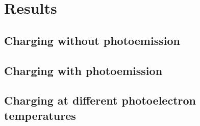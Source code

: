 \chapter{Results}
\label{sec:results}

\section{Charging without photoemission}

\section{Charging with photoemission}

\section{Charging at different photoelectron temperatures}